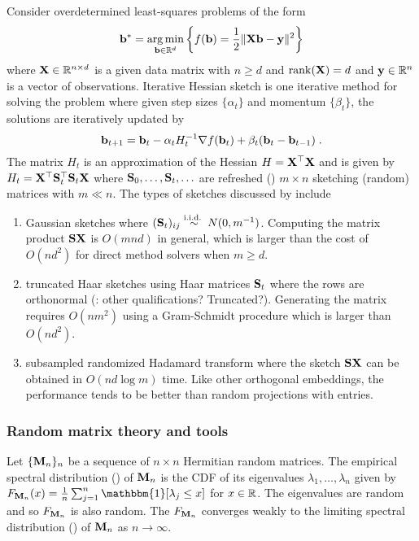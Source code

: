 \documentclass[10pt]{article}
\begin{document}
Consider overdetermined least-squares problems of the form
\[
\mathbf{b}^* = \operatorname*{arg\,min}_{\mathbf{b}\in\mathbb{R}^d}\left\{f(\mathbf{b}) = \frac{1}{2}\|\mathbf{X}\mathbf{b}-\mathbf{y}\|^2\right\}
\]
where $\mathbf{X}\in\mathbb{R}^{n\times d}$ is a given data matrix with $n\geq d$ and $\mathrm{rank}(\mathbf{X})=d$ and $\mathbf{y}\in\mathbb{R}^n$ is a vector of observations. Iterative Hessian sketch is one iterative method for solving the problem where given step sizes $\{\alpha_t\}$ and momentum $\{\beta_t\}$, the solutions are iteratively updated by
\[
\mathbf{b}_{t+1} = \mathbf{b}_t - \alpha_tH_t^{-1}\nabla f(\mathbf{b}_t)+\beta_t(\mathbf{b}_t-\mathbf{b}_{t-1}) \;.
\]
The matrix $H_t$ is an approximation of the Hessian $H=\mathbf{X}^\top\mathbf{X}$ and is given by $H_t=\mathbf{X}^\top \mathbf{S}_t^\top \mathbf{S}_t\mathbf{X}$ where $\mathbf{S}_0,\ldots,\mathbf{S}_t,\ldots$ are refreshed (\iid) $m\times n$ sketching (random) matrices with $m\ll n$. The types of sketches discussed by \citet{Lacotte:2020} include
\begin{enumerate}

\item
Gaussian sketches where $(\mathbf{S}_t)_{ij}\overset{\text{i.i.d.\ }}{\sim} N(0,m^{-1})$. Computing the matrix product $\mathbf{S}\mathbf{X}$ is $O(mnd)$ in general, which is larger than the cost of $O(nd^2)$ for direct method solvers when $m\geq d$.

\item
truncated Haar sketches using Haar matrices $\mathbf{S}_t$ where the rows are orthonormal (\todo: other qualifications? Truncated?). Generating the matrix requires $O(nm^2)$ using a Gram-Schmidt procedure which is larger than $O(nd^2)$.

\item
subsampled randomized Hadamard transform where the sketch $\mathbf{S}\mathbf{X}$ can be obtained in $O(nd\log m)$ time. Like other orthogonal embeddings, the performance tends to be better than random projections with \iid entries.

\end{enumerate}


\subsubsection{Random matrix theory and tools}

Let $\{\mathbf{M}_n\}_n$ be a sequence of $n\times n$ Hermitian random matrices. The empirical spectral distribution (\esd) of $\mathbf{M}_n$ is the CDF of its eigenvalues $\lambda_1,\ldots,\lambda_n$ given by $F_{\bfM_n}(x)=\frac{1}{n}\sum_{j=1}^n\mathbbm{1}[\lambda_j\leq x]$ for $x\in\mathbb{R}$. The eigenvalues are random and so $F_{\mathbf{M}_n}$ is also random. The \esd $F_{\mathbf{M}_n}$ converges weakly to the limiting spectral distribution (\lsd) of $\mathbf{M}_n$ as $n\rightarrow\infty$.
\\
\end{document}

